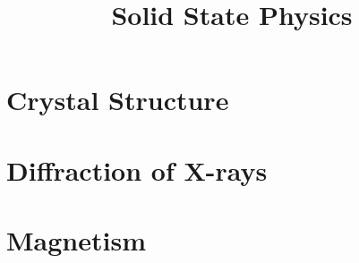 \documentclass[11pt,a4paper]{book}
\title{Solid State Physics}
\begin{document}
\maketitle
\chapter{Crystal Structure}

\chapter{Diffraction of X-rays}

\chapter{Magnetism}

\end{document}
